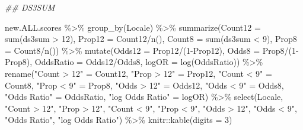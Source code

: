 \documentclass[
  letterpaper,
  DIV=11,
  numbers=noendperiod]{scrartcl}
\newenvironment{Shaded}{\begin{snugshade}}{\end{snugshade}}
\newcommand{\AttributeTok}[1]{\textcolor[rgb]{0.40,0.45,0.13}{#1}}
\newcommand{\DecValTok}[1]{\textcolor[rgb]{0.68,0.00,0.00}{#1}}
\newcommand{\DocumentationTok}[1]{\textcolor[rgb]{0.37,0.37,0.37}{\textit{#1}}}
\newcommand{\FunctionTok}[1]{\textcolor[rgb]{0.28,0.35,0.67}{#1}}
\newcommand{\NormalTok}[1]{\textcolor[rgb]{0.00,0.23,0.31}{#1}}
\newcommand{\OtherTok}[1]{\textcolor[rgb]{0.00,0.23,0.31}{#1}}
\newcommand{\SpecialCharTok}[1]{\textcolor[rgb]{0.37,0.37,0.37}{#1}}
\newcommand{\StringTok}[1]{\textcolor[rgb]{0.13,0.47,0.30}{#1}}
\begin{document}
\begin{Shaded}
\begin{Highlighting}[]
\DocumentationTok{\#\# DS3SUM}

\NormalTok{new.ALL.scores }\SpecialCharTok{\%\textgreater{}\%}
  \FunctionTok{group\_by}\NormalTok{(Locale) }\SpecialCharTok{\%\textgreater{}\%}
  \FunctionTok{summarize}\NormalTok{(}\AttributeTok{Count12 =} \FunctionTok{sum}\NormalTok{(ds3sum }\SpecialCharTok{\textgreater{}} \DecValTok{12}\NormalTok{),}
            \AttributeTok{Prop12 =}\NormalTok{ Count12}\SpecialCharTok{/}\FunctionTok{n}\NormalTok{(),}
            \AttributeTok{Count8 =} \FunctionTok{sum}\NormalTok{(ds3sum }\SpecialCharTok{\textless{}} \DecValTok{9}\NormalTok{),}
            \AttributeTok{Prop8 =}\NormalTok{ Count8}\SpecialCharTok{/}\FunctionTok{n}\NormalTok{()) }\SpecialCharTok{\%\textgreater{}\%}
  \FunctionTok{mutate}\NormalTok{(}\AttributeTok{Odds12 =}\NormalTok{ Prop12}\SpecialCharTok{/}\NormalTok{(}\DecValTok{1}\SpecialCharTok{{-}}\NormalTok{Prop12),}
         \AttributeTok{Odds8 =}\NormalTok{ Prop8}\SpecialCharTok{/}\NormalTok{(}\DecValTok{1}\SpecialCharTok{{-}}\NormalTok{Prop8),}
         \AttributeTok{OddsRatio =}\NormalTok{ Odds12}\SpecialCharTok{/}\NormalTok{Odds8,}
         \AttributeTok{logOR =} \FunctionTok{log}\NormalTok{(OddsRatio)) }\SpecialCharTok{\%\textgreater{}\%}
  \FunctionTok{rename}\NormalTok{(}\StringTok{"Count \textgreater{} 12"} \OtherTok{=}\NormalTok{ Count12,}
         \StringTok{"Prop \textgreater{} 12"} \OtherTok{=}\NormalTok{ Prop12,}
         \StringTok{"Count \textless{} 9"} \OtherTok{=}\NormalTok{ Count8,}
         \StringTok{"Prop \textless{} 9"} \OtherTok{=}\NormalTok{ Prop8,}
         \StringTok{"Odds \textgreater{} 12"} \OtherTok{=}\NormalTok{ Odds12,}
         \StringTok{"Odds \textless{} 9"} \OtherTok{=}\NormalTok{ Odds8,}
         \StringTok{"Odds Ratio"} \OtherTok{=}\NormalTok{ OddsRatio,}
         \StringTok{"log Odds Ratio"} \OtherTok{=}\NormalTok{ logOR) }\SpecialCharTok{\%\textgreater{}\%}
  \FunctionTok{select}\NormalTok{(Locale, }\StringTok{"Count \textgreater{} 12"}\NormalTok{, }\StringTok{"Prop \textgreater{} 12"}\NormalTok{, }\StringTok{"Count \textless{} 9"}\NormalTok{, }\StringTok{"Prop \textless{} 9"}\NormalTok{, }\StringTok{"Odds \textgreater{} 12"}\NormalTok{, }\StringTok{"Odds \textless{} 9"}\NormalTok{, }\StringTok{"Odds Ratio"}\NormalTok{, }\StringTok{"log Odds Ratio"}\NormalTok{) }\SpecialCharTok{\%\textgreater{}\%}
\NormalTok{  knitr}\SpecialCharTok{::}\FunctionTok{kable}\NormalTok{(}\AttributeTok{digits =} \DecValTok{3}\NormalTok{)}
\end{Highlighting}
\end{Shaded}
\end{document}
